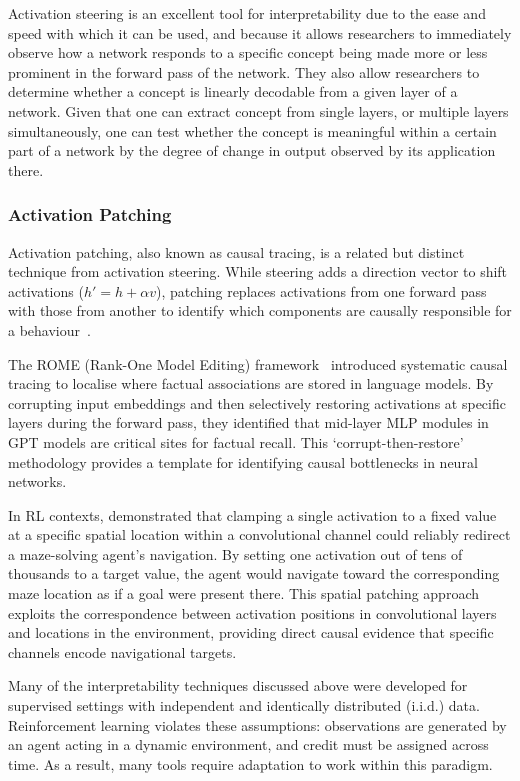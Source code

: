 Activation steering is an excellent tool for interpretability due to the ease and speed with which it can be used, and because it allows researchers to immediately observe how a network responds to a specific concept being made more or less prominent in the forward pass of the network. They also allow researchers to determine whether a concept is linearly decodable from a given layer of a network. Given that one can extract concept from single layers, or multiple layers simultaneously, one can test whether the concept is meaningful within a certain part of a network by the degree of change in output observed by its application there.

\subsubsection{Activation Patching}\label{subsubsec:activation_patching}
Activation patching, also known as causal tracing, is a related but distinct technique from activation steering. While steering adds a direction vector to shift activations ($h' = h + \alpha v$), patching replaces activations from one forward pass with those from another to identify which components are causally responsible for a behaviour~\citep{meng_2023_locating}.

The ROME (Rank-One Model Editing) framework~\citep{meng_2023_locating} introduced systematic causal tracing to localise where factual associations are stored in language models. By corrupting input embeddings and then selectively restoring activations at specific layers during the forward pass, they identified that mid-layer MLP modules in GPT models are critical sites for factual recall. This `corrupt-then-restore' methodology provides a template for identifying causal bottlenecks in neural networks.

In RL contexts, \citet{mini_2023_understanding} demonstrated that clamping a single activation to a fixed value at a specific spatial location within a convolutional channel could reliably redirect a maze-solving agent's navigation. By setting one activation out of tens of thousands to a target value, the agent would navigate toward the corresponding maze location as if a goal were present there. This spatial patching approach exploits the correspondence between activation positions in convolutional layers and locations in the environment, providing direct causal evidence that specific channels encode navigational targets.

Many of the interpretability techniques discussed above were developed for supervised settings with independent and identically distributed (i.i.d.) data. Reinforcement learning violates these assumptions: observations are generated by an agent acting in a dynamic environment, and credit must be assigned across time. As a result, many tools require adaptation to work within this paradigm.

